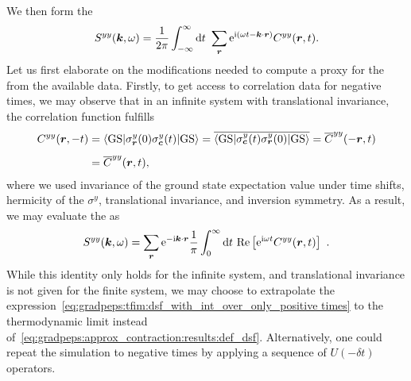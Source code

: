 We then form the 
\begin{equation}
    \label{eq:gradpeps:approx_contraction:results:def_dsf}
    S^{yy}(\boldsymbol{k},\omega) = \frac{1}{2\pi} \int_{-\infty}^{\infty} \,\! \mathrm{d} {t} \,\! ~ \sum_{\boldsymbol{r}} \mathrm{e}^{\mathrm{i}(\omega t - \boldsymbol{k}\cdot \boldsymbol{r})} C^{yy}(\boldsymbol{r}, t)
    .
\end{equation}
Let us first elaborate on the modifications needed to compute a proxy for the  from the available data.
%
Firstly, to get access to correlation data for negative times, we may observe that in an infinite system with translational invariance, the correlation function fulfills
\begin{align}
    \begin{split}
        C^{yy}(\vec{r},-t)
        &= \braopket{\text{GS}}{\sigma^y_{\vec{r}}(0) \sigma^y_{\vec{c}}(t)}{\text{GS}}
        = \conj{\braopket{\text{GS}}{\sigma^y_{\vec{c}}(t) \sigma^y_{\vec{r}}(0)}{\text{GS}}}
        = \conj{C}^{yy}(-\vec{r},t)
        \\[1ex]
        &= \conj{C}^{yy}(\vec{r},t)
        ,
    \end{split}
\end{align}
where we used invariance of the ground state expectation value under time shifts, hermicity of the $\sigma^y$, translational invariance, and inversion symmetry.
%
As a result, we may evaluate the  as
\begin{equation}
    \label{eq:gradpeps:tfim:dsf_with_int_over_only_positive times}
    S^{yy}(\vec{k},\omega) = \sum_{\vec{r}} \eto{-\im \vec{k}\cdot \vec{r}} \frac{1}{\pi} \int_{0}^{\infty} \d{t} ~ \mathrm{Re}\sBr{ \eto{\im\omega t} C^{yy}(\vec{r}, t)}
    ~.
\end{equation}
%
While this identity only holds for the infinite system, and translational invariance is not given for the finite system, we may choose to extrapolate the expression~\eqref{eq:gradpeps:tfim:dsf_with_int_over_only_positive times} to the thermodynamic limit instead of~\eqref{eq:gradpeps:approx_contraction:results:def_dsf}.
%
Alternatively, one could repeat the simulation to negative times by applying a sequence of $U(-\delta t)$ operators.



